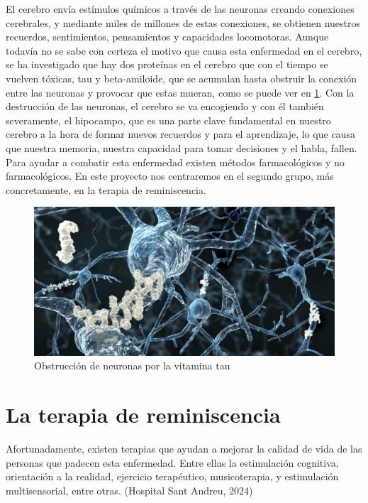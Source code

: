 El cerebro envía estímulos químicos a través de las neuronas creando conexiones cerebrales, y mediante miles de millones de estas conexiones, se obtienen nuestros recuerdos, sentimientos, pensamientos y capacidades locomotoras. Aunque todavía no se sabe con certeza el motivo que causa esta enfermedad en el cerebro, se ha investigado que hay dos proteínas en el cerebro que con el tiempo se vuelven tóxicas, tau y beta-amiloide, que se acumulan hasta obstruir la conexión entre las neuronas y provocar que estas mueran, como se puede ver en \ref{fig:tau}.  Con la destrucción de las neuronas, el cerebro se va encogiendo y con él también severamente, el hipocampo, que es una parte clave fundamental en nuestro cerebro a la hora de formar nuevos recuerdos y para el aprendizaje, lo que causa que nuestra memoria, nuestra capacidad para tomar decisiones y el habla, fallen. Para ayudar a combatir esta enfermedad existen métodos farmacológicos y no farmacológicos. En este proyecto nos centraremos en el segundo grupo, más concretamente, en la terapia de reminiscencia. \\

\begin{figure}[h]
	\centering
	\includegraphics[width = 1 \textwidth]{Imagenes/Vectorial/proteina-tau.jpg}
	\caption{Obstrucción de neuronas por la vitamina tau}
	\label{fig:tau}
\end{figure}


\section{La terapia de reminiscencia}

Afortunadamente, existen terapias que ayudan a mejorar la calidad de vida de las personas que padecen esta enfermedad. Entre ellas la estimulación cognitiva, orientación a la realidad, ejercicio terapéutico, musicoterapia, y estimulación multisensorial, entre otras. (Hospital Sant Andreu, 2024)\\

